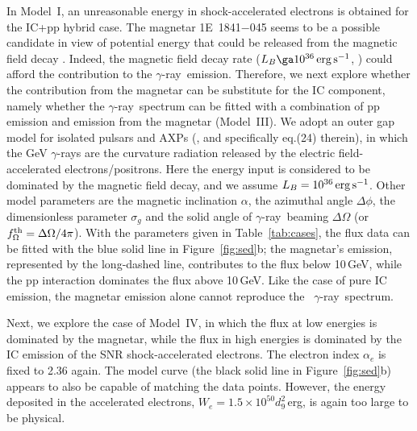 \documentclass[12pt,preprint]{aastex}
\newcommand{\erg}{\,{\rm erg}}        \newcommand{\K}{\,{\rm K}}
\newcommand{\du}{d_{9}} \newcommand{\Du}{D_{20}}
\newcommand{\gray}{{\rm $\gamma$-ray}}
\begin{document}
In Model~I, an unreasonable energy in shock-accelerated electrons is
obtained for the IC+pp hybrid case.
The magnetar 1E~1841$-$045 seems to be a possible candidate 
in view of potential energy that could be released from the magnetic field decay
\citep{Takata2013mag,Hongjun2013}.
Indeed, the magnetic field decay rate 
($L_B\ga10^{36}\erg\ps$, \citealt{Yeung2017kes73})
could afford the contribution to the \gray\ emission.
 Therefore, we next explore
 whether the contribution from the magnetar can be  substitute for the IC component,
 namely whether the \gray\ spectrum can be fitted with a combination of
pp emission and emission from  the magnetar (Model~III).
We adopt an outer gap model for isolated pulsars and AXPs
(\citealt{Cheng2001mag,ljzhang2013ApJ}, and specifically eq.(24) therein),
in which the GeV $\gamma$-rays are the curvature radiation released
by the electric field-accelerated electrons/positrons.
Here the energy input is considered to be dominated by the magnetic field decay,
and we assume  $L_B=10^{36}\erg\ps$.
Other model parameters are
the magnetic inclination $\alpha$, the azimuthal angle $\Delta\phi$,
the  dimensionless parameter $\sigma_g$ and  the solid angle of \gray\ beaming
$\Delta\Omega$ (or $f_{\Omega}^{\rm th}=\Delta\Omega/4\pi$).
With the parameters given in Table~\ref{tab:cases},
the flux data can be fitted with the blue solid line in Figure~\ref{fig:sed}b;
the magnetar's emission, represented by the  long-dashed line,
 contributes  to the flux below 10\,GeV, while the pp interaction
 dominates the flux above 10\,GeV.
Like the case of pure IC emission, the magnetar emission alone
cannot reproduce the \Fermi\ \gray\ spectrum.

Next, we explore the case of Model~IV, in which the flux  at low energies
is dominated by the magnetar, while the flux in high energies is
dominated by the IC emission of the SNR shock-accelerated electrons.
The electron index $\alpha_e$ is fixed to 2.36 again.
The model curve (the black solid line in Figure~\ref{fig:sed}b)
appears to also be capable of matching the data points.
However, the energy deposited in the accelerated electrons,
$W_e=1.5\times10^{50}\du^2$\,erg, is again too large to be physical.
\end{document}
